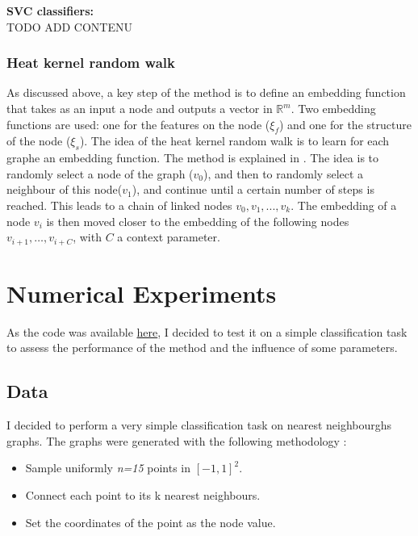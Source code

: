 \documentclass[a4paper,11pt]{article}
\begin{document}
\textbf{SVC classifiers: }\\

TODO ADD CONTENU
\subsubsection{Heat kernel random walk}

As discussed above, a key step of the method is to define an embedding function that takes as an input a node and outputs a vector in $\mathbb{R}^m$.
Two embedding functions are used: one for the features on the node ($\xi_f$) and one for the structure of the node ($\xi_s$).
The idea of the heat kernel random walk is to learn for each graphe an embedding function. 
The method is explained in \cite{abu2018watch}. 
The idea is to randomly select a node of the graph ($v_0$), and then to randomly select a neighbour of this node($v_1$), and continue until a certain number of steps is reached.
This leads to a chain of linked nodes $v_0, v_1, ..., v_k$.
The embedding of a node $v_i$ is then moved closer to the embedding of the following nodes $ v_{i+1}, \dots, v_{i+C} $, with $C$ a context parameter. 


\section{Numerical Experiments}

As the code was available \href{https://github.com/wokas36/RWK}{here}, I decided to test it on a simple classification task to assess the performance of the method and the influence of some parameters. 

\subsection{Data}

I decided to perform a very simple classification task on nearest neighbourghs graphs. 
The graphs were generated with the following methodology : \\
\begin{itemize}
    \item Sample uniformly \textit{n=15} points in $[-1, 1]^2$. 
    \item Connect each point to its k nearest neighbours.
    \item Set the coordinates of the point as the node value. \\
\end{itemize}
\end{document}
